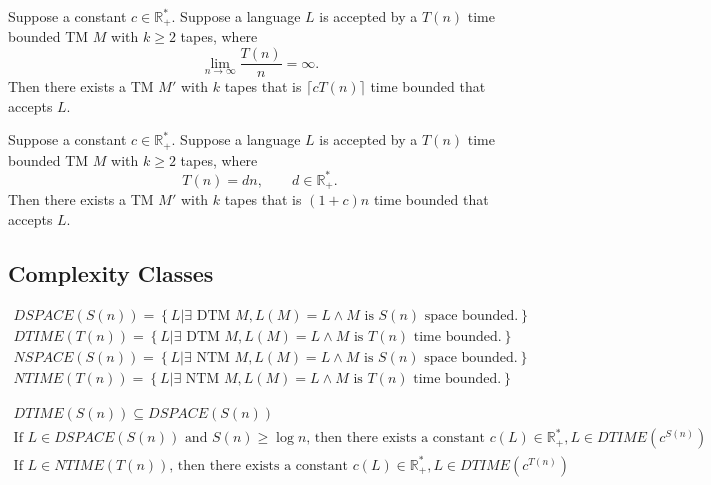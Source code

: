 \begin{theorem}
  Suppose a constant $c\in \mathbb{R}^{*}_{+}$. Suppose a language $L$ is accepted
  by a $T(n)$ time bounded TM $M$ with $k\ge 2$ tapes, where
  \[\lim_{n \to \infty} \frac{T(n)}{n}=\infty.\]
  Then there exists a TM $M'$ with $k$ tapes that is $\lceil cT(n)\rceil$ time
  bounded that accepts $L$.
\end{theorem}

\begin{corollary}
  Suppose a constant $c\in \mathbb{R}^{*}_{+}$. Suppose a language $L$ is accepted
  by a $T(n)$ time bounded TM $M$ with $k\ge 2$ tapes, where
  \[T(n)=dn,\qquad d\in \mathbb{R}^{*}_+.\]
  Then there exists a TM $M'$ with $k$ tapes that is $\left( 1+c \right) n$
  time bounded that accepts $L$.
\end{corollary}

\subsection{Complexity Classes}
\begin{notation}
  \begin{gather*}
    DSPACE(S(n))=\left\{ L|\exists \text{ DTM }M, L(M)=L\wedge M\text{ is
    }S(n)\text{ space bounded.} \right\} \\
    DTIME(T(n))=\left\{ L|\exists \text{ DTM }M, L(M)=L\wedge M\text{ is
    }T(n)\text{ time bounded.} \right\} \\
    NSPACE(S(n))=\left\{ L|\exists \text{ NTM }M, L(M)=L\wedge M\text{ is
    }S(n)\text{ space bounded.} \right\} \\
    NTIME(T(n))=\left\{ L|\exists \text{ NTM }M, L(M)=L\wedge M\text{ is
    }T(n)\text{ time bounded.} \right\} 
  \end{gather*}
\end{notation}

\begin{theorem}
  \begin{gather*}
    DTIME\left( S\left( n \right)  \right) \subseteq DSPACE\left( S\left( n
    \right)  \right) \\
    \text{If }L\in DSPACE\left( S\left( n \right)  \right)\text{ and }S\left(
    n \right) \ge\log{n}\text{, then there exists a constant }c(L)\in
    \mathbb{R_+^{*}}, L\in DTIME\left( c^{S\left( n \right) } \right)\\
    \text{If }L \in NTIME\left( T\left( n \right) \right)\text{, then there
    exists a constant } c(L)\in \mathbb{R}^{*}_+, L\in DTIME\left( c^{T\left( n
    \right) } \right) 
  \end{gather*}
\end{theorem}

